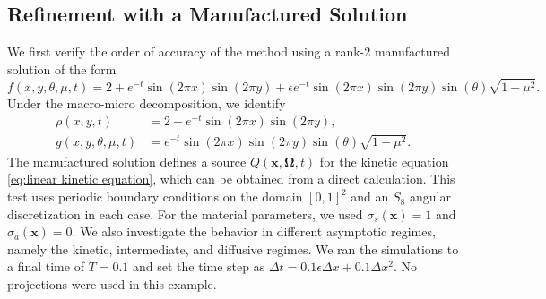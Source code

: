 \documentclass[onefignum,onetabnum]{siamart220329}
\begin{document}
\subsection{Refinement with a Manufactured Solution}
\label{subsec:manufactured test}

We first verify the order of accuracy of the method using a rank-2 manufactured solution of the form
\begin{equation*}
    f(x,y,\theta,\mu,t) = 2 + e^{-t} \sin \left( 2\pi x\right) \sin \left( 2\pi y\right) + \epsilon e^{-t} \sin \left( 2\pi x\right) \sin \left( 2\pi y\right) \sin \left(\theta\right) \sqrt{1-\mu^{2}}.
\end{equation*}
Under the macro-micro decomposition, we identify
\begin{align}
    \rho(x,y,t) &= 2 + e^{-t} \sin \left( 2\pi x\right) \sin \left( 2\pi y\right), \label{eq:manufactured solution rho} \\
    g(x,y,\theta, \mu, t) &= e^{-t} \sin \left( 2\pi x\right) \sin \left( 2\pi y\right) \sin \left(\theta\right) \sqrt{1-\mu^{2}}. \label{eq:manufactured solution g}
\end{align}
The manufactured solution defines a source $Q(\mathbf{x}, \mathbf{\Omega},t)$ for the kinetic equation \eqref{eq:linear kinetic equation}, which can be obtained from a direct calculation. This test uses periodic boundary conditions on the domain $[0, 1]^{2}$ and an $S_{8}$ angular discretization in each case. For the material parameters, we used $\sigma_{s}(\mathbf{x}) = 1$ and $\sigma_{a}(\mathbf{x}) = 0$. We also investigate the behavior in different asymptotic regimes, namely the kinetic, intermediate, and diffusive regimes. We ran the simulations to a final time of $T = 0.1$ and set the time step as $\Delta t = 0.1 \epsilon \Delta x + 0.1 \Delta x^{2}.$
No projections were used in this example.
\end{document}
